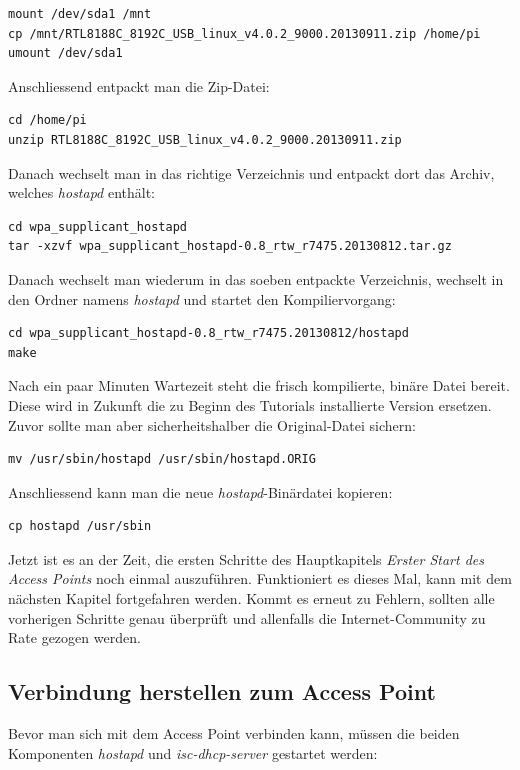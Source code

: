 \begin{lstlisting}
mount /dev/sda1 /mnt
cp /mnt/RTL8188C_8192C_USB_linux_v4.0.2_9000.20130911.zip /home/pi
umount /dev/sda1
\end{lstlisting} 

Anschliessend entpackt man die Zip-Datei:

\begin{lstlisting}
cd /home/pi
unzip RTL8188C_8192C_USB_linux_v4.0.2_9000.20130911.zip
\end{lstlisting}

Danach wechselt man in das richtige Verzeichnis und entpackt dort das Archiv, welches \textit{hostapd} enthält:

\begin{lstlisting}
cd wpa_supplicant_hostapd
tar -xzvf wpa_supplicant_hostapd-0.8_rtw_r7475.20130812.tar.gz
\end{lstlisting}

Danach wechselt man wiederum in das soeben entpackte Verzeichnis, wechselt in den Ordner namens \textit{hostapd} und startet den Kompiliervorgang:

\begin{lstlisting}
cd wpa_supplicant_hostapd-0.8_rtw_r7475.20130812/hostapd
make
\end{lstlisting}

Nach ein paar Minuten Wartezeit steht die frisch kompilierte, binäre Datei bereit. Diese wird in Zukunft die zu Beginn des Tutorials installierte Version ersetzen. Zuvor sollte man aber sicherheitshalber die Original-Datei sichern:

\begin{lstlisting}
mv /usr/sbin/hostapd /usr/sbin/hostapd.ORIG
\end{lstlisting}

Anschliessend kann man die neue \textit{hostapd}-Binärdatei kopieren:

\begin{lstlisting}
cp hostapd /usr/sbin	
\end{lstlisting}

Jetzt ist es an der Zeit, die ersten Schritte des Hauptkapitels \textit{Erster Start des Access Points} noch einmal auszuführen. Funktioniert es dieses Mal, kann mit dem nächsten Kapitel fortgefahren werden. Kommt es erneut zu Fehlern, sollten alle vorherigen Schritte genau überprüft und allenfalls die Internet-Community zu Rate gezogen werden.

\subsection{Verbindung herstellen zum Access Point}
Bevor man sich mit dem Access Point verbinden kann, müssen die beiden Komponenten \textit{hostapd} und \textit{isc-dhcp-server} gestartet werden:

